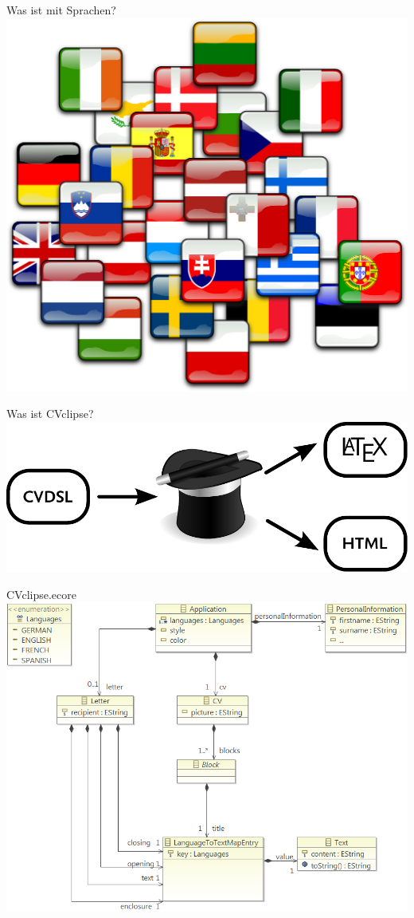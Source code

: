 \documentclass[fleqn,11pt,nexus]{beamer}
\begin{document}
\begin{frame}{Was ist mit Sprachen?}
	\centering
	\includegraphics[scale=0.075]{images/flags}
\end{frame}

\begin{frame}{Was ist CVclipse?}
	\centering
	\includegraphics[scale=0.7]{images/workflow}
\end{frame}

\begin{frame}{CVclipse.ecore}
	\centering
	\includegraphics[scale=0.3]{images/model}
\end{frame}
\end{document}
